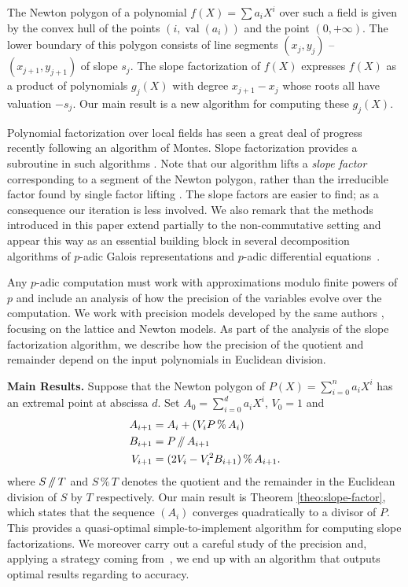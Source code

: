 \documentclass{sig-alternate-05-2015}
\DeclareMathOperator{\val}{val}
\renewcommand{\mod}{\,\%\,}
\renewcommand{\div}{\,/\hspace{-0.3em}/\,}
\theoremstyle{definition}
\begin{document}
The Newton polygon of a polynomial $f(X) = \sum a_i X^i$ over such a field is given by
the convex hull of the points $(i, \val(a_i))$ and the point $(0, +\infty)$.  The lower
boundary of this polygon consists of line segments $(x_j,y_j)$ -- $(x_{j+1},y_{j+1})$
of slope $s_j$.  The slope factorization of $f(X)$ expresses $f(X)$ as a product
of polynomials $g_j(X)$ with degree $x_{j+1} - x_j$ whose roots all have valuation $-s_j$.
Our main result is a new algorithm for computing these $g_j(X)$.

Polynomial factorization over local fields has seen a great deal of progress recently
following an algorithm of Montes.  Slope factorization provides a subroutine
in such algorithms \cite[Section~2]{pauli:10a}.  Note that our algorithm lifts
a \emph{slope factor} corresponding to a segment of the Newton polygon,
rather than the irreducible factor found by single factor lifting \cite{guardia-nart-pauli:12a}.
The slope factors are easier to find; as a consequence our iteration is less involved.
We also remark that the methods introduced in this paper extend 
partially to the non-commutative setting and appear this way as an
essential building block in several decomposition algorithms of 
$p$-adic Galois representations and $p$-adic differential 
equations~\cite{caruso:16}.

Any $p$-adic computation must work with approximations modulo finite
powers of $p$ and include an analysis of how the precision of the variables evolve over the computation.
We work with precision models developed by the same authors
\cite[Section~4.2]{caruso-roe-vaccon:14a}, focusing on the lattice and Newton models.
As part of the analysis of the slope factorization algorithm, we describe
how the precision of the quotient and remainder depend on the input polynomials
in Euclidean division.

\medskip

\noindent
{\bf Main Results.}
%
Suppose that the Newton polygon of $P(X) = \sum_{i=0}^n a_i X^i$
has an extremal point at abscissa $d$.
Set $A_0 = \sum_{i=0}^d a_i X^i$, $V_0 = 1$ and
\begin{align*}
A_{i+1} &= A_i + (V_i P \mod A_i) \\
B_{i+1} &= P \div A_{i+1} \\
V_{i+1} &= (2V_i - V_i^2B_{i+1}) \mod A_{i+1}.
\end{align*}
where $S \div T$ and $S \mod T$ denotes the quotient and the
remainder in the Euclidean division of $S$ by $T$ respectively.
Our main result is Theorem \ref{theo:slope-factor},
which states that the sequence $(A_i)$ converges quadratically
to a divisor of $P$. This provides a quasi-optimal simple-to-implement 
algorithm for computing slope factorizations.
We moreover carry out a careful study of the precision and, applying
a strategy coming from~\cite{caruso-roe-vaccon:14a}, we end up with
an algorithm that outputs optimal results regarding to accuracy.
\end{document}
